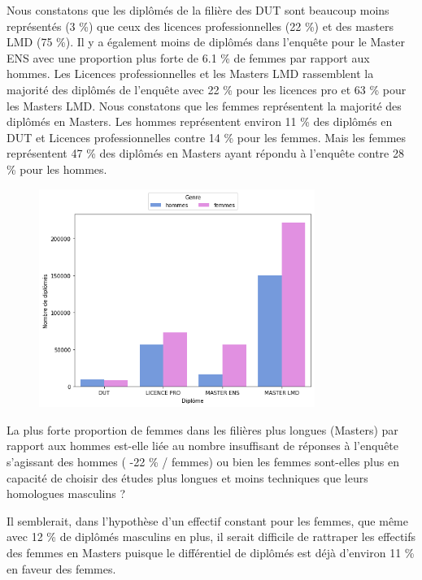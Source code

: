 \documentclass[12pt, a4paper, titlepage, table]{article}
\begin{document}
	Nous constatons que les diplômés de la filière des DUT sont beaucoup moins représentés (3 \%) que ceux des licences professionnelles (22 \%) et des masters LMD (75 \%). Il y a également moins de diplômés dans l'enquête pour le Master ENS avec une proportion plus forte de 6.1 \% de femmes par rapport aux hommes.
	Les Licences professionnelles et les Masters LMD rassemblent la majorité des diplômés de l'enquête avec 22 \% pour les licences pro et 63 \% pour les Masters LMD.
	Nous constatons que les femmes représentent la majorité des diplômés en Masters. Les hommes représentent environ 11 \% des diplômés en DUT et Licences professionnelles contre 14 \% pour les femmes. Mais les femmes représentent 47 \% des diplômés en Masters ayant répondu à l'enquête contre 28 \% pour les hommes.
		\begin{figure}[H]
			\centering
			\includegraphics[width=0.8\textwidth]{../graphs/nombre_diplome_genre.png}
			\label{fig:diplome_genre}
		\end{figure}
	
	La plus forte proportion de femmes dans les filières plus longues (Masters) par rapport aux hommes est-elle liée au nombre insuffisant de réponses à l'enquête s'agissant des hommes ( -22 \% / femmes) ou bien les femmes sont-elles plus en capacité de choisir des études plus longues et moins techniques que leurs homologues masculins ?
	
	Il semblerait, dans l'hypothèse d'un effectif constant pour les femmes, que même avec 12 \% de diplômés masculins en plus, il serait difficile de rattraper les effectifs des femmes en Masters puisque le différentiel de diplômés est déjà d'environ 11 \% en faveur des femmes.      
\end{document}
